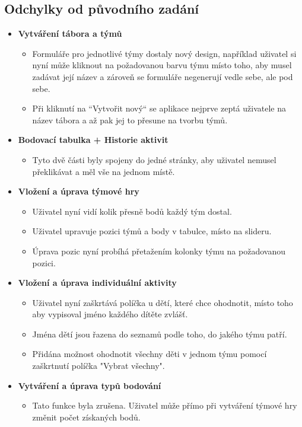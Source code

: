\documentclass[a4paper, 12pt]{article} %
\begin{document}
\subsection{Odchylky od původního zadání}
\begin{itemize}
    \item \textbf{Vytváření tábora a týmů}
    \begin{itemize}
        \item Formuláře pro jednotlivé týmy dostaly nový design, například uživatel si nyní může
        kliknout na požadovanou barvu týmu místo toho, aby musel zadávat její název a zároveň se 
        formuláře negenerují vedle sebe, ale pod sebe. 
        \item Při kliknutí na ``Vytvořit nový`` se aplikace nejprve zeptá uživatele na název 
        tábora a až pak jej to přesune na tvorbu týmů.
    \end{itemize}
    \item \textbf{Bodovací tabulka + Historie aktivit}
    \begin{itemize}
        \item Tyto dvě části byly spojeny do jedné stránky, aby uživatel nemusel překlikávat 
        a měl vše na jednom místě.
    \end{itemize}
    \item \textbf{Vložení a úprava týmové hry}
    \begin{itemize}
        \item Uživatel nyní vidí kolik přesně bodů každý tým dostal.
        \item Uživatel upravuje pozici týmů a body v tabulce, místo na slideru.
        \item Úprava pozic nyní probíhá přetažením kolonky týmu na požadovanou pozici.
    \end{itemize}
    \item \textbf{Vložení a úprava individuální aktivity}
    \begin{itemize}
        \item Uživatel nyní zaškrtává políčka u dětí, které chce ohodnotit, místo toho aby 
        vypisoval jméno každého dítěte zvlášť.
        \item Jména dětí jsou řazena do seznamů podle toho, do jakého týmu patří.
        \item Přidána možnost ohodnotit všechny děti v jednom týmu pomocí zaškrtnutí políčka 
        "Vybrat všechny".
    \end{itemize}
    \item \textbf{Vytváření a úprava typů bodování}
    \begin{itemize}
        \item Tato funkce byla zrušena. Uživatel může přímo při vytváření týmové hry změnit 
        počet získaných bodů.
    \end{itemize}        
\end{itemize}
\end{document}

